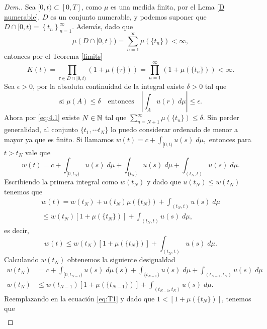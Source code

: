 \begin{proof}[Dem.]
	Sea $[0,t)\subset[0,T]$, como $\mu$ es una medida finita, por el Lema \ref{D numerable}, $D$ es un conjunto numerable, y podemos suponer que  $ D\cap[0,t)=\left\lbrace t_n\right\rbrace _{n=1}^\infty$. 
	Además, dado que  
	\begin{equation}\mu(D\cap[0,t))=\sum_{n=1}^\infty\mu(\{t_n\})<\infty,\label{eq:4.1}
	\end{equation}
	entonces por el Teorema \ref{limits}
 $$K(t)=\prod_{\tau\in D\cap[0,t)}\left( 1+\mu(\{\tau\})\right)=\displaystyle\prod_{n=1}^\infty\left( 1+\mu(\{t_n\})\right) < \infty.$$
	Sea $\epsilon>0$, por la absoluta continuidad de la integral existe $\delta>0$ tal que   $$\text{si } \mu(A)\leq\delta\quad \text{entonces}\quad \left| \int_Au(r)\; d\mu\right| \leq \epsilon.$$
	 Ahora por \eqref{eq:4.1} existe $N\in\mathbb{N}$ tal que $\displaystyle\sum_{n=N+1}^{\infty}\mu(\{t_n\})\leq \delta$. Sin perder generalidad, al conjunto  $\{t_1,\cdots t_N\}$ lo puedo considerar ordenado de menor a mayor ya que es finito. 
	Si llamamos $w(t)=c+\displaystyle\int_{[0,t)}u(s)\;d\mu,$ entonces para $t>t_N$ vale que
	\begin{equation*}
		w(t)=c+\int_{[0,t_N)}u(s)\;d\mu+\int_{\{t_N\}}u(s)\;d\mu+\int_{(t_N,t)}u(s)\;d\mu.
	\end{equation*}
Escribiendo la primera integral como $w(t_N)$ y dado que $u(t_N)\leq w(t_N)$ tenemos que
	\begin{multline*}
	w(t)=w(t_N)+u(t_N)\mu(\{t_N\})+\int_{(t_N,t)}u(s)\;d\mu\\
	\leq w(t_N)\left[ 1+\mu(\{t_N\})\right] +\int_{(t_N,t)}u(s)\;d\mu,
\end{multline*}
es decir,
\begin{equation}\label{eq:T1}
	w(t)\leq  w(t_N)\left[ 1+\mu(\{t_N\})\right] +\int_{(t_N,t)}u(s)\;d\mu.
\end{equation}
Calculando $w(t_N)$  obtenemos la siguiente desigualdad
\begin{equation}
\begin{split}
	w(t_N)&=c+\int_{[0,t_{N-1})}u(s)\;d\mu(s)+\int_{\{t_{N-1}\}}u(s)\;d\mu+\int_{(t_{N-1},t_N)}u(s)\;d\mu\\
	w(t_N)&\leq w(t_{N-1})\left[1+ \mu(\{t_{N-1}\})\right] +\int_{(t_{N-1},t_N)}u(s)\;d\mu.\label{eq:T2}
 \end{split}
\end{equation}
Reemplazando en la ecuación \eqref{eq:T1}  y  dado que $1<[1+\mu(\{t_N\})]$, tenemos que
\begin{multline*}

\end{multline*}
\end{proof}
